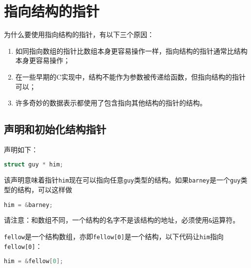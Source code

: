 \section{指向结构的指针}
\begin{frame}[fragile]\ft{\secname}
为什么要使用指向结构的指针，有以下三个原因：

\begin{enumerate}
\item 如同指向数组的指针比数组本身更容易操作一样，指向结构的指针通常比结构本身更容易操作；
\item 在一些早期的C实现中，结构不能作为参数被传递给函数，但指向结构的指针可以；
\item 许多奇妙的数据表示都使用了包含指向其他结构的指针的结构。
\end{enumerate}
\end{frame}

\subsection{声明和初始化结构指针}
\begin{frame}[fragile]\ft{\subsecname}
  声明如下：
    \begin{lstlisting}[language=c,backgroundcolor=\color{red!20}]
struct guy * him;
    \end{lstlisting}
该声明意味着指针\verb|him|现在可以指向任意\verb|guy|类型的结构。如果\verb|barney|是一个\verb|guy|类型的结构，可以这样做
    \begin{lstlisting}[language=c,backgroundcolor=\color{red!20}]
him = &barney;
    \end{lstlisting}
    请注意：{和数组不同，一个结构的名字不是该结构的地址，必须使用\verb|&|运算符。}
\end{frame}

\begin{frame}[fragile]\ft{\subsecname}
  \verb|fellow|是一个结构数组，亦即\verb|fellow[0]|是一个结构，以下代码让\verb|him|指向\verb|fellow[0]|：
    \begin{lstlisting}[language=c,backgroundcolor=\color{red!20}]
him = &fellow[0];
    \end{lstlisting}

\end{frame}


